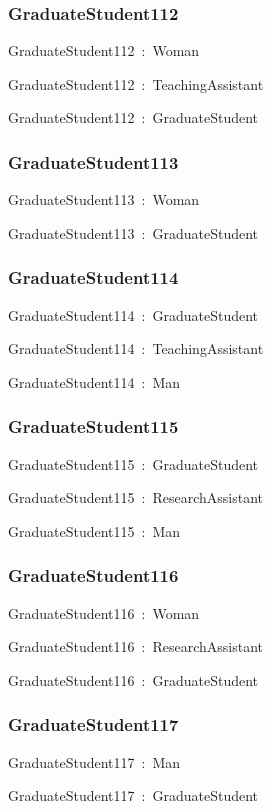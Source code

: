 \documentclass{article}
\begin{document}
\subsubsection*{GraduateStudent112}

GraduateStudent112~:~Woman

GraduateStudent112~:~TeachingAssistant

GraduateStudent112~:~GraduateStudent

\subsubsection*{GraduateStudent113}

GraduateStudent113~:~Woman

GraduateStudent113~:~GraduateStudent

\subsubsection*{GraduateStudent114}

GraduateStudent114~:~GraduateStudent

GraduateStudent114~:~TeachingAssistant

GraduateStudent114~:~Man

\subsubsection*{GraduateStudent115}

GraduateStudent115~:~GraduateStudent

GraduateStudent115~:~ResearchAssistant

GraduateStudent115~:~Man

\subsubsection*{GraduateStudent116}

GraduateStudent116~:~Woman

GraduateStudent116~:~ResearchAssistant

GraduateStudent116~:~GraduateStudent

\subsubsection*{GraduateStudent117}

GraduateStudent117~:~Man

GraduateStudent117~:~GraduateStudent
\end{document}
